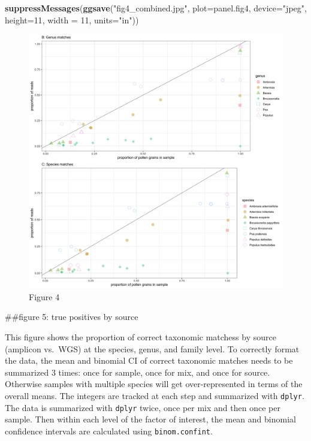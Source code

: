 \documentclass[
]{article}
\newenvironment{Shaded}{\begin{snugshade}}{\end{snugshade}}
\newcommand{\DataTypeTok}[1]{\textcolor[rgb]{0.13,0.29,0.53}{#1}}
\newcommand{\DecValTok}[1]{\textcolor[rgb]{0.00,0.00,0.81}{#1}}
\newcommand{\KeywordTok}[1]{\textcolor[rgb]{0.13,0.29,0.53}{\textbf{#1}}}
\newcommand{\NormalTok}[1]{#1}
\newcommand{\StringTok}[1]{\textcolor[rgb]{0.31,0.60,0.02}{#1}}
\begin{document}
\begin{Shaded}
\begin{Highlighting}[]
\KeywordTok{suppressMessages}\NormalTok{(}\KeywordTok{ggsave}\NormalTok{(}\StringTok{"fig4_combined.jpg"}\NormalTok{, }\DataTypeTok{plot=}\NormalTok{panel.fig4, }\DataTypeTok{device=}\StringTok{"jpeg"}\NormalTok{, }\DataTypeTok{height=}\DecValTok{11}\NormalTok{, }\DataTypeTok{width =} \DecValTok{11}\NormalTok{, }\DataTypeTok{units=}\StringTok{"in"}\NormalTok{))}
\end{Highlighting}
\end{Shaded}

\begin{figure}
\centering
\includegraphics{fig4_combined.jpg}
\caption{Figure 4}
\end{figure}

\#\#figure 5: true positives by source

This figure shows the proportion of correct taxonomic matchess by source
(amplicon vs.~WGS) at the species, genus, and family level. To correctly
format the data, the mean and binomial CI of correct taxonomic matches
needs to be summarized 3 times: once for sample, once for mix, and once
for source. Otherwise samples with multiple species will get
over-represented in terms of the overall means. The integers are tracked
at each step and summarized with \texttt{dplyr}. The data is summarized
with \texttt{dplyr} twice, once per mix and then once per sample. Then
within each level of the factor of interest, the mean and binomial
confidence intervals are calculated using \texttt{binom.confint}.
\end{document}
